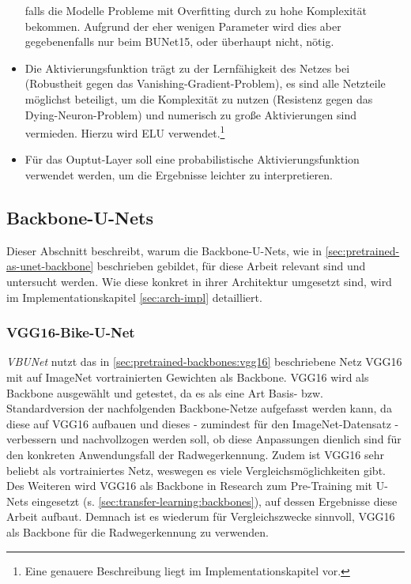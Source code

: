 \begin{itemize}
	falls die Modelle Probleme mit Overfitting durch zu hohe Komplexität bekommen. 
	Aufgrund der eher wenigen Parameter wird dies aber gegebenenfalls nur beim \ac{BUNet15}, 
	oder überhaupt nicht, nötig.
	\item Die Aktivierungsfunktion trägt zu der Lernfähigkeit des Netzes bei (Robustheit gegen das Vanishing-Gradient-Problem), 
	es sind alle Netzteile möglichst beteiligt, um die Komplexität zu nutzen (Resistenz gegen das Dying-Neuron-Problem) und
	numerisch zu große Aktivierungen sind vermieden. Hierzu wird \ac{ELU} verwendet.\footnote{Eine genauere Beschreibung liegt im Implementationskapitel vor.}
	\item Für das Ouptut-Layer soll eine probabilistische Aktivierungsfunktion verwendet werden, 
	um die Ergebnisse leichter zu interpretieren.
\end{itemize}


\subsection{Backbone-U-Nets}

Dieser Abschnitt beschreibt, warum die Backbone-U-Nets, wie in \autoref{sec:pretrained-as-unet-backbone} beschrieben gebildet,
für diese Arbeit relevant sind und untersucht werden. Wie diese konkret in ihrer Architektur umgesetzt sind, 
wird im Implementationskapitel \autoref{sec:arch-impl} detailliert.  

\subsubsection{VGG16-Bike-U-Net}

\textit{\ac{VBUNet}} nutzt das in \autoref{sec:pretrained-backbones:vgg16} beschriebene Netz VGG16 
mit auf ImageNet vortrainierten Gewichten als Backbone. 
VGG16 wird als Backbone ausgewählt und getestet, da es als eine Art Basis- bzw. Standardversion der nachfolgenden 
Backbone-Netze aufgefasst werden kann, da diese auf VGG16 aufbauen und dieses - zumindest 
für den ImageNet-Datensatz - verbessern und nachvollzogen werden soll, ob diese Anpassungen dienlich sind 
für den konkreten Anwendungsfall der Radwegerkennung. Zudem ist VGG16 sehr beliebt als vortrainiertes 
Netz, weswegen es viele Vergleichsmöglichkeiten gibt. 
Des Weiteren wird VGG16 als Backbone in Research zum Pre-Training mit U-Nets eingesetzt (s. \autoref{sec:transfer-learning:backbones}), 
auf dessen Ergebnisse diese Arbeit aufbaut. 
Demnach ist es wiederum für Vergleichszwecke sinnvoll, VGG16 als Backbone für die Radwegerkennung zu verwenden.   

